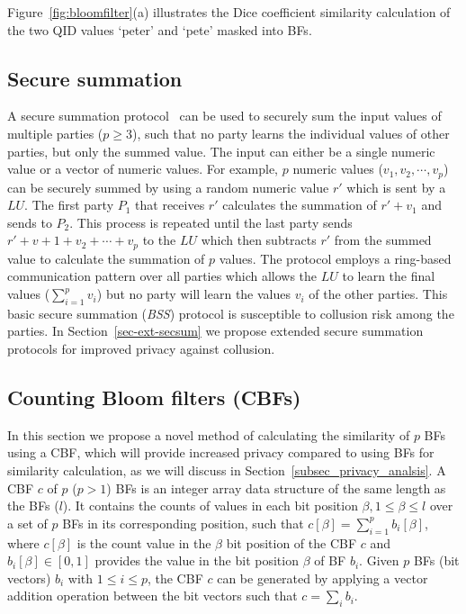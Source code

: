 \documentclass{sig-alternate}
\begin{document}
Figure~\ref{fig:bloomfilter}(a) illustrates the Dice coefficient 
similarity calculation of the two QID values `peter' and `pete'
masked into BFs.

\subsection{Secure summation}
\label{subsec-secsum}
A secure summation protocol~\cite{Clif02} can be used
to securely sum the input values of multiple 
parties ($p \ge 3$), such that no party learns the individual values
of other parties, but only the summed value.
The input can either be a single numeric value or
a vector of numeric values. 
For example, $p$ numeric values ($v_1,v_2,\cdots,v_p$) can be securely summed
by using a random numeric value $r'$ which is sent by a $LU$.
The first party $P_1$ that receives $r'$ calculates the summation
of $r'+ v_1$ and sends to $P_2$. This process is repeated until
the last party sends $r'+v+1+v_2+\cdots+v_p$ to the $LU$ which then
subtracts $r'$ from the summed value to calculate the summation of
$p$ values.
The protocol employs a ring-based communication pattern over all parties 
which allows the $LU$ to learn the final values ($\sum_{i=1}^p v_i$) 
but no party will learn the
values $v_i$ of the other parties.
This basic secure summation (\emph{BSS}) protocol is susceptible to
collusion risk among the parties. In Section~\ref{sec-ext-secsum}
we propose extended secure summation protocols for improved
privacy against collusion.

\subsection{Counting Bloom filters (CBFs)}
\label{subsec-cbf}

In this section we propose a novel method of calculating the similarity
of $p$ BFs using a CBF, which will provide increased privacy
compared to using BFs for similarity calculation, as we will
discuss in Section~\ref{subsec_privacy_analsis}.
A CBF $c$ of $p$ ($p > 1$) BFs is an integer array
data structure of the same length as the BFs ($l$).
It contains the counts
of values in each bit position $\beta, 1 \le \beta \le l$ over a set of $p$ BFs
in its corresponding position, such that $c[\beta] = \sum_{i=1}^p b_i[\beta]$, where
$c[\beta]$ is the count value in the $\beta$ bit position of the CBF $c$ and
$b_i[\beta] \in[0,1]$ provides the value in the bit position $\beta$ of BF $b_i$.
Given $p$ BFs (bit vectors) $b_i$ with $1 \le i \le p$, the CBF
$c$ can be generated by applying a vector addition operation
between the bit vectors such that $c = \sum_i b_i$.
\end{document}
